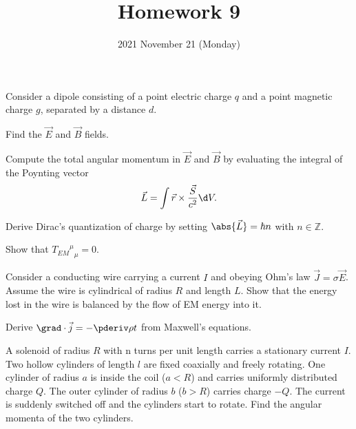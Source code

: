 \documentclass{phys151}
\title{Homework 9}
\date{2021 November 21 (Monday)}
\author{}
\begin{document}
\begin{problem}
  Consider a dipole consisting of a point electric charge \(q\) and a point
  magnetic charge \(g\), separated by a distance \(d\).
  \begin{subproblems}
    \item Find the \(\vec E\) and \(\vec B\) fields.
    \item Compute the total angular momentum in \(\vec E\) and \(\vec B\) by
      evaluating the integral of the Poynting vector
      \[
        \vec L = \int \vec r \times \frac {\vec S} {c^2} \d V.
      \]
    \item Derive Dirac's quantization of charge by setting \(\abs{\vec L} =
      \hbar n\) with \(n\in\mathbb Z\).
  \end{subproblems}
\end{problem}

\begin{solution}

\end{solution}

\begin{problem}
  Show that \({{T_{EM}}^\mu}_\mu = 0\).
\end{problem}

\begin{solution}

\end{solution}

\begin{problem}
  Consider a conducting wire carrying a current \(I\) and obeying Ohm's law
  \(\vec J = \sigma \vec E\).  Assume the wire is cylindrical of radius \(R\)
  and length \(L\).  Show that the energy lost in the wire is balanced by the
  flow of EM energy into it.
\end{problem}

\begin{solution}

\end{solution}

\begin{problem}
  Derive \(\grad\cdot\vec j = -\pderiv \rho t\) from Maxwell's equations.
\end{problem}

\begin{solution}

\end{solution}

\begin{problem}
  A solenoid of radius \(R\) with n turns per unit length carries a stationary
  current \(I\).  Two hollow cylinders of length \(l\) are fixed coaxially and
  freely rotating.  One cylinder of radius \(a\) is inside the coil (\(a<R\))
  and carries uniformly distributed charge \(Q\).  The outer cylinder of radius
  \(b\) (\(b>R\)) carries charge \(-Q\).  The current is suddenly switched off
  and the cylinders start to rotate.  Find the angular momenta of the two
  cylinders.
\end{problem}

\begin{solution}
  
\end{solution}
\end{document}
